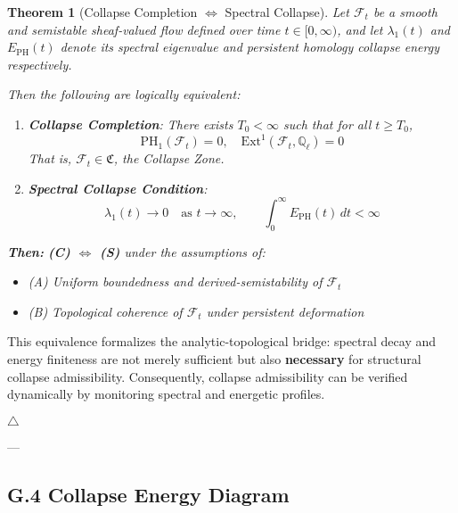\documentclass[11pt]{article}
\newtheorem{theorem}{Theorem}[section]
\begin{document}
\begin{theorem}[Collapse Completion $\Longleftrightarrow$ Spectral Collapse]
Let \( \mathcal{F}_t \) be a smooth and semistable sheaf-valued flow defined over time \( t \in [0, \infty) \), and let \( \lambda_1(t) \) and \( E_{\mathrm{PH}}(t) \) denote its spectral eigenvalue and persistent homology collapse energy respectively.

Then the following are logically equivalent:
\begin{enumerate}
    \item[\textbf{(C)}] \textbf{Collapse Completion}:  
    There exists \( T_0 < \infty \) such that for all \( t \geq T_0 \),
    \[
    \mathrm{PH}_1(\mathcal{F}_t) = 0, \quad \mathrm{Ext}^1(\mathcal{F}_t, \mathbb{Q}_\ell) = 0
    \]
    That is, \( \mathcal{F}_t \in \mathfrak{C} \), the Collapse Zone.
    
    \item[\textbf{(S)}] \textbf{Spectral Collapse Condition}:
    \[
    \lambda_1(t) \to 0 \quad \text{as } t \to \infty, \qquad \int_0^\infty E_{\mathrm{PH}}(t)\, dt < \infty
    \]
\end{enumerate}

\noindent
\textbf{Then:} \quad \textbf{(C) $\Longleftrightarrow$ (S)} under the assumptions of:
\begin{itemize}
    \item (A) Uniform boundedness and derived-semistability of \( \mathcal{F}_t \)
    \item (B) Topological coherence of \( \mathcal{F}_t \) under persistent deformation
\end{itemize}
\end{theorem}

\noindent
This equivalence formalizes the analytic-topological bridge: spectral decay and energy finiteness are not merely sufficient but also \textbf{necessary} for structural collapse admissibility.  
Consequently, collapse admissibility can be verified dynamically by monitoring spectral and energetic profiles.

\hfill $\triangle$

---

\subsection*{G.4 Collapse Energy Diagram}

\begin{center}
\end{center}
\end{document}

